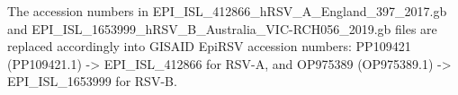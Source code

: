 The accession numbers in EPI_ISL_412866_hRSV_A_England_397_2017.gb and EPI_ISL_1653999_hRSV_B_Australia_VIC-RCH056_2019.gb files are replaced accordingly into GISAID EpiRSV accession numbers:
PP109421 (PP109421.1) -> EPI_ISL_412866 for RSV-A, and 
OP975389 (OP975389.1) -> EPI_ISL_1653999 for RSV-B.